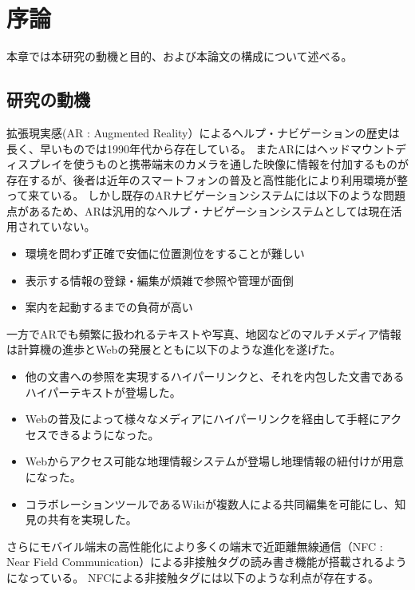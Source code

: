 \chapter{序論}
\label{chap:introduction}


本章では本研究の動機と目的、および本論文の構成について述べる。

\newpage


\section{研究の動機}
\label{motive}

拡張現実感(AR : Augmented Reality）によるヘルプ・ナビゲーションの歴史は長く、早いものでは1990年代から存在している。
またARにはヘッドマウントディスプレイを使うものと携帯端末のカメラを通した映像に情報を付加するものが存在するが、後者は近年のスマートフォンの普及と高性能化により利用環境が整って来ている。
しかし既存のARナビゲーションシステムには以下のような問題点があるため、ARは汎用的なヘルプ・ナビゲーションシステムとしては現在活用されていない。

\begin{itemize}
  \item 環境を問わず正確で安価に位置測位をすることが難しい
  \item 表示する情報の登録・編集が煩雑で参照や管理が面倒
  \item 案内を起動するまでの負荷が高い
\end{itemize}

一方でARでも頻繁に扱われるテキストや写真、地図などのマルチメディア情報は計算機の進歩とWebの発展とともに以下のような進化を遂げた。

\begin{itemize}
  \item 他の文書への参照を実現するハイパーリンクと、それを内包した文書であるハイパーテキストが登場した。
  \item Webの普及によって様々なメディアにハイパーリンクを経由して手軽にアクセスできるようになった。
  \item Webからアクセス可能な地理情報システムが登場し地理情報の紐付けが用意になった。
  \item コラボレーションツールであるWikiが複数人による共同編集を可能にし、知見の共有を実現した。
\end{itemize}

さらにモバイル端末の高性能化により多くの端末で近距離無線通信（NFC : Near Field Communication）による非接触タグの読み書き機能が搭載されるようになっている。
NFCによる非接触タグには以下のような利点が存在する。

